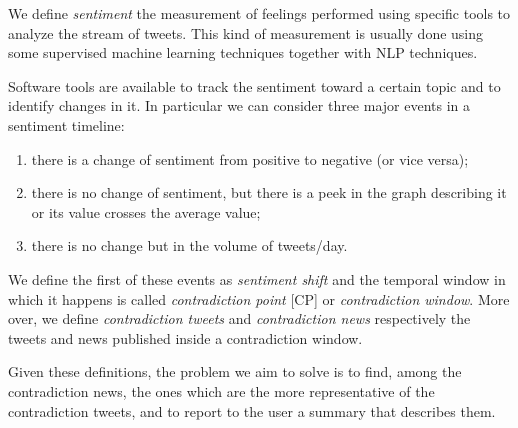 We define \emph{sentiment} the measurement of feelings performed using specific tools to analyze the stream of tweets.
This kind of measurement is usually done using some supervised machine learning techniques together with NLP techniques.

Software tools are available to track the sentiment toward a certain topic and to identify changes in it. In particular we can consider three major events in a sentiment timeline:

\begin{enumerate}
	\item there is a change of sentiment from positive to negative (or
		vice versa);
	\item there is no change of sentiment, but there is a peek in the graph
		describing it or its value crosses the average value;
	\item there is no change but in the volume of tweets/day.
\end{enumerate}

We define the first of these events as \emph{sentiment shift} and the temporal window in which it happens is called \emph{contradiction point} [CP] or \emph{contradiction window}. 
More over, we define \emph{contradiction tweets} and \emph{contradiction news} respectively the tweets and news published inside a contradiction window.

Given these definitions, the problem we aim to solve is to find, among the contradiction news, the ones which are the more representative of the contradiction tweets, and to report to the user a summary that describes them.
